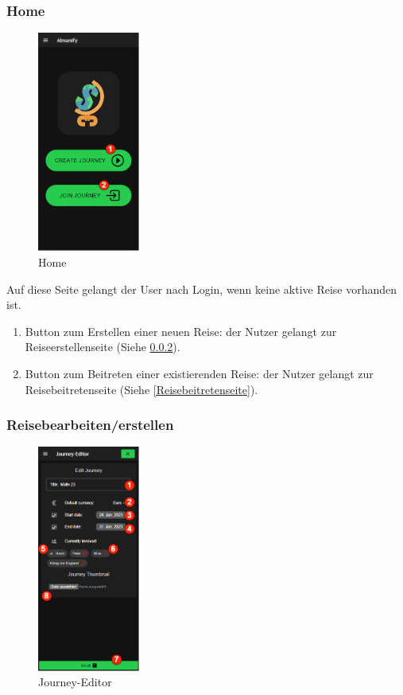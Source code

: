 \subsubsection{Home}\label{Home}
\begin{figure}[H]
	\centering
	\includegraphics[width=0.3\textwidth]{img/pages_numbers/home.drawio}
	\caption[Home]{Home}
	\label{fig:Home}
\end{figure}

Auf diese Seite gelangt der User nach Login, wenn keine aktive Reise vorhanden ist.

\begin{enumerate}[label=\protect\circled{\arabic*}]
	\item Button zum Erstellen einer neuen Reise: der Nutzer gelangt zur Reiseerstellenseite (Siehe \ref{Journey-Editor}).
	\item Button zum Beitreten einer existierenden Reise: der Nutzer gelangt zur Reisebeitretenseite (Siehe \ref{Reisebeitretenseite}).
\end{enumerate}

\subsubsection{Reisebearbeiten/erstellen}\label{Journey-Editor}
\begin{figure}[H]
	\centering
	\includegraphics[width=0.3\textwidth]{img/pages_numbers/journey-editor.drawio}
	\caption[Journey-Editor]{Journey-Editor}
	\label{fig:Journey-Editor}
\end{figure}

